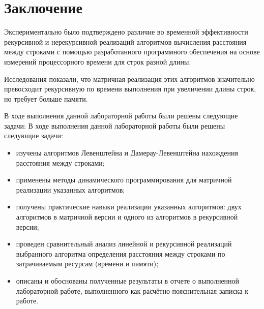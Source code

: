 \chapter*{Заключение}

Экспериментально было подтверждено различие во временной эффективности рекурсивной и нерекурсивной реализаций алгоритмов вычисления расстояния между строками с помощью разработанного программного обеспечения на основе измерений процессорного времени для строк разной длины.

Исследования показали, что матричная реализация этих алгоритмов значительно превосходит рекурсивную по времени выполнения при увеличении длины строк, но требует больше памяти.

\vspace{5mm}

В ходе выполнения данной лабораторной работы были решены следующие задачи:
В ходе выполнения данной лабораторной работы были решены следующие задачи:
\begin{itemize}
	\item изучены алгоритмов Левенштейна и Дамерау-Левенштейна нахождения расстояния между строками;
	\item применены методы динамического программирования для матричной реализации указанных алгоритмов;
	\item получены практические навыки реализации указанных алгоритмов: двух алгоритмов в матричной версии и одного из алгоритмов в рекурсивной версии;
	\item проведен сравнительный анализ линейной и рекурсивной реализаций выбранного алгоритма определения расстояния между строками по затрачиваемым ресурсам (времени и памяти);
	\item описаны и обоснованы полученные результаты в отчете о выполненной лабораторной работе, выполненного как расчётно-пояснительная записка к работе.
\end{itemize}